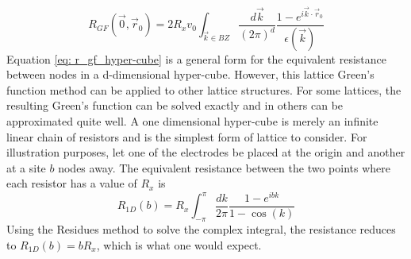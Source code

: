 \begin{equation}
R_{GF}(\vec{0},\vec{r}_0) = 2 R_x v_0 \int_{\vec{k} \in BZ} \frac{d \vec{k}}{(2 \pi)^d} \frac{1-e^{i \vec{k}\cdot \vec{r}_0}}{\epsilon(\vec{k})}
\label{eq: r_gf_hyper-cube}
\end{equation}
Equation \ref{eq: r_gf_hyper-cube} is a general form for the equivalent resistance between nodes in a d-dimensional hyper-cube. However, this lattice Green's function method can be applied to other lattice structures. For some lattices, the resulting Green's function can be solved exactly and in others can be approximated quite well. A one dimensional hyper-cube is merely an infinite linear chain of resistors and is the simplest form of lattice to consider. For illustration purposes, let one of the electrodes be placed at the origin and another at a site $b$ nodes away. The equivalent resistance between the two points where each resistor has a value of $R_x$ is
\begin{equation}
R_{1D}(b) = R_x\int_{- \pi} ^{\pi} \frac{dk}{2 \pi} \frac{1 - e^{i b k}}{1 - \cos (k)}
\end{equation}
Using the Residues method to solve the complex integral\cite{berg2014}, the resistance reduces to $R_{1D}(b) = bR_x$, which is what one would expect.


